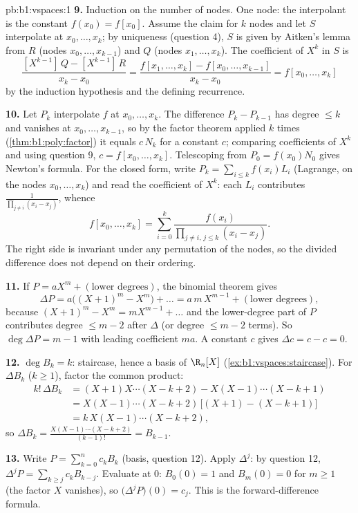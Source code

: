 \begin{solution}{pb:b1:vspaces:1}
\textbf{9.} Induction on the number of nodes. One node: the
interpolant is the constant $f(x_0) = f[x_0]$. Assume the claim
for $k$ nodes and let $S$ interpolate at $x_0, \dots, x_k$; by
uniqueness (question 4), $S$ is given by Aitken's lemma from $R$
(nodes $x_0, \dots, x_{k-1}$) and $Q$ (nodes $x_1, \dots, x_k$).
The coefficient of $X^{k}$ in $S$ is
\[
\frac{[X^{k-1}]\,Q - [X^{k-1}]\,R}{x_k - x_0}
= \frac{f[x_1, \dots, x_k] - f[x_0, \dots, x_{k-1}]}{x_k - x_0}
= f[x_0, \dots, x_k]
\]
by the induction hypothesis and the defining recurrence.

\textbf{10.} Let $P_k$ interpolate $f$ at $x_0, \dots, x_k$. The
difference $P_k - P_{k-1}$ has degree $\leq k$ and vanishes at
$x_0, \dots, x_{k-1}$, so by the factor theorem applied $k$ times
(\cref{thm:b1:poly:factor}) it equals $c\,N_k$ for a constant $c$;
comparing coefficients of $X^{k}$ and using question 9, $c =
f[x_0, \dots, x_k]$. Telescoping from $P_0 = f(x_0) N_0$ gives
Newton's formula. For the closed form, write $P_k = \sum_{i \leq
k} f(x_i) L_i$ (Lagrange, on the nodes $x_0, \dots, x_k$) and read
the coefficient of $X^{k}$: each $L_i$ contributes
$\frac{1}{\prod_{j \neq i}(x_i - x_j)}$, whence
\[
f[x_0, \dots, x_k] = \sum_{i=0}^{k}
\frac{f(x_i)}{\prod_{j \neq i,\, j \leq k}(x_i - x_j)} .
\]
The right side is invariant under any permutation of the nodes, so
the divided difference does not depend on their ordering.

\textbf{11.} If $P = a X^m + (\text{lower degrees})$, the binomial
theorem gives
\[
\Delta P = a\bigl((X+1)^m - X^m\bigr) + \dots
= a\,m\,X^{m-1} + (\text{lower degrees}),
\]
because $(X+1)^m - X^m = m X^{m-1} + \dots$ and the lower-degree
part of $P$ contributes degree $\leq m - 2$ after $\Delta$ (or
degree $\leq m-2$ terms). So $\deg \Delta P = m - 1$ with leading
coefficient $m a$. A constant $c$ gives $\Delta c = c - c = 0$.

\textbf{12.} $\deg B_k = k$: staircase, hence a basis of
$\R_n[X]$ (\cref{ex:b1:vspaces:staircase}). For $\Delta B_k$
($k \geq 1$), factor the common product:
\begin{align*}
k!\,\Delta B_k
&= (X+1)X\cdots(X-k+2) - X(X-1)\cdots(X-k+1) \\
&= X(X-1)\cdots(X-k+2)\,\bigl[(X+1) - (X-k+1)\bigr] \\
&= k\,X(X-1)\cdots(X-k+2),
\end{align*}
so $\Delta B_k = \frac{X(X-1)\cdots(X-k+2)}{(k-1)!} = B_{k-1}$.

\textbf{13.} Write $P = \sum_{k=0}^{n} c_k B_k$ (basis, question
12). Apply $\Delta^{j}$: by question 12, $\Delta^{j} P = \sum_{k
\geq j} c_k B_{k-j}$. Evaluate at $0$: $B_0(0) = 1$ and $B_m(0) =
0$ for $m \geq 1$ (the factor $X$ vanishes), so
$\bigl(\Delta^{j}P\bigr)(0) = c_j$. This is the forward-difference
formula.


\end{solution}
